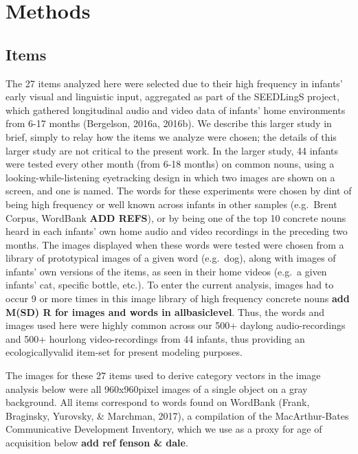 \documentclass[10pt, letterpaper]{article}
\begin{document}
\section{Methods}\label{methods}

\subsection{Items}\label{items}

The 27 items analyzed here were selected due to their high frequency in
infants' early visual and linguistic input, aggregated as part of the
SEEDLingS project, which gathered longitudinal audio and video data of
infants' home environments from 6-17 months (Bergelson, 2016a, 2016b).
We describe this larger study in brief, simply to relay how the items we
analyze were chosen; the details of this larger study are not critical
to the present work. In the larger study, 44 infants were tested every
other month (from 6-18 months) on common nouns, using a
looking-while-listening eyetracking design in which two images are shown
on a screen, and one is named. The words for these experiments were
chosen by dint of being high frequency or well known across infants in
other samples (e.g.~Brent Corpus, WordBank \textbf{ADD REFS}), or by
being one of the top 10 concrete nouns heard in each infants' own home
audio and video recordings in the preceding two months. The images
displayed when these words were tested were chosen from a library of
prototypical images of a given word (e.g.~dog), along with images of
infants' own versions of the items, as seen in their home videos (e.g.~a
given infants' cat, specific bottle, etc.). To enter the current
analysis, images had to occur 9 or more times in this image library of
high frequency concrete nouns \textbf{add M(SD) R for images and words
in allbasiclevel}. Thus, the words and images used here were highly
common across our 500+ daylong audio-recordings and 500+ hourlong
video-recordings from 44 infants, thus providing an ecologicallyvalid
item-set for present modeling purposes.

The images for these 27 items used to derive category vectors in the
image analysis below were all 960x960pixel images of a single object on
a gray background. All items correspond to words found on WordBank
(Frank, Braginsky, Yurovsky, \& Marchman, 2017), a compilation of the
MacArthur-Bates Communicative Development Inventory, which we use as a
proxy for age of acquisition below \textbf{add ref fenson \& dale}.
\end{document}
